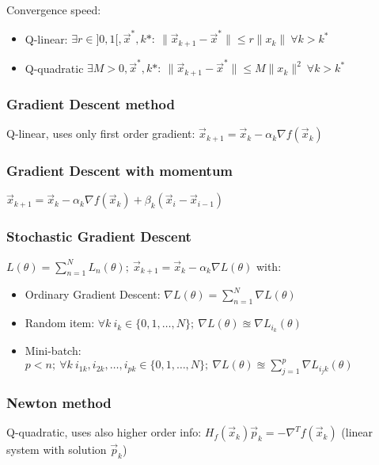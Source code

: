 \documentclass[]{article}
\begin{document}
	Convergence speed:
	\begin{itemize}
		\item Q-linear: $\exists r\in]0,1[, \vec{x}^*, k*: \  \lVert \vec{x}_{k+1}-\vec{x}^* \rVert \le r \lVert x_k \rVert \ \forall k > k^*$
		\item Q-quadratic $\exists M>0, \vec{x}^*, k*: \  \lVert \vec{x}_{k+1}-\vec{x}^* \rVert \le M \lVert x_k \rVert^2 \ \forall k > k^*$
	\end{itemize}
	
	\subsubsection{Gradient Descent method}
		
	Q-linear, uses only first order gradient: $\vec{x}_{k+1} = \vec{x}_k - \alpha_k \nabla f(\vec{x}_k)$
	
	\subsubsection{Gradient Descent with momentum}
	
	$\vec{x}_{k+1} = \vec{x}_k - \alpha_k \nabla f(\vec{x}_k) + \beta_k (\vec{x}_i - \vec{x}_{i-1})$
	
	\subsubsection{Stochastic Gradient Descent}
	
	$L(\theta)=\sum\limits_{n=1}^N L_n(\theta); \ \vec{x}_{k+1} = \vec{x}_k - \alpha_k \nabla L(\theta)$ with:
	\begin{itemize}
		\item Ordinary Gradient Descent: $\nabla L(\theta) = \sum\limits_{n=1}^N \nabla L(\theta)$ 
		\item Random item: $\forall k \ i_k\in\{0,1,\dots,N\}; \ \nabla L(\theta) \approxeq \nabla L_{i_k}(\theta)$
		\item Mini-batch: $p < n; \ \forall k \ i_{1k},i_{2k},\dots,i_{pk}\in\{0,1,\dots,N\}; \ \nabla L(\theta) \approxeq \sum\limits_{j=1}^p \nabla L_{i_jk}(\theta)$
	\end{itemize}
	 
	
	\subsubsection{Newton method}
	
	Q-quadratic, uses also higher order info:
	$H_f(\vec{x}_k)\vec{p}_k = -\nabla^T f(\vec{x}_k)$ (linear system with solution $\vec{p}_k$)
	
\end{document}
